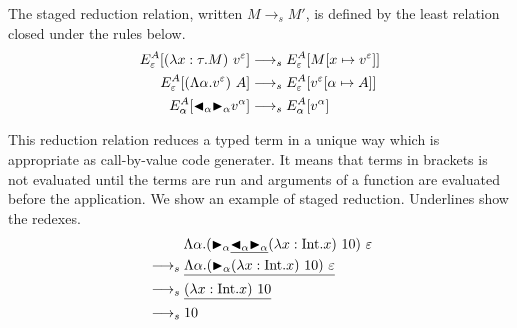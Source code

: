 \begin{definition}
	The staged reduction relation, written $M \longrightarrow_s M'$, is defined by
	the least relation closed under the rules below.
	\begin{align*}
		E^A_\varepsilon [(\lambda x:\tau.M)\ v^\varepsilon] & \longrightarrow_s E^A_\varepsilon[M[x\mapsto v^\varepsilon]]      \\
		E^A_\varepsilon [(\Lambda\alpha.v^\varepsilon)\ A]  & \longrightarrow_s E^A_\varepsilon[v^\varepsilon[\alpha\mapsto A]] \\
		E^A_\alpha [{\mathop{\blacktriangleleft}}_\alpha {\mathop{\blacktriangleright}}_\alpha v^\alpha]        & \longrightarrow_s E^A_\alpha[v^\alpha]                            \\
	\end{align*}
\end{definition}

This reduction relation reduces a typed term in a unique way 
which is appropriate as call-by-value code generater.
It means that terms in brackets is not evaluated until the terms are run
and arguments of a function are evaluated before the application.
We show an example of staged reduction.
Underlines show the redexes.
\begin{align*}
	& \hspace{9mm} \Lambda\alpha.({\mathop{\blacktriangleright}}_\alpha \underline{{\mathop{\blacktriangleleft}}_\alpha {\mathop{\blacktriangleright}}_\alpha} (\lambda x:\textrm{Int}.x)\ 10)\ \varepsilon \\
	& \longrightarrow_s \underline{\Lambda\alpha.({\mathop{\blacktriangleright}}_\alpha (\lambda x:\textrm{Int}.x)\ 10)\ \varepsilon} \\
	& \longrightarrow_s \underline{(\lambda x:\textrm{Int}.x)\ 10} \\
	& \longrightarrow_s 10
\end{align*}